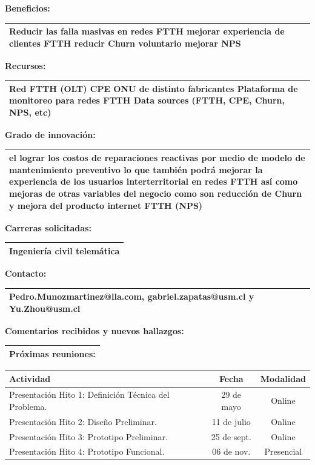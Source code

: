 \documentclass[12pt, a4paper]{article}
\newcommand{\cajarespuesta}[2]{
    \vspace{0.2cm}
    \noindent \textbf{#1} \\
    \begin{tabularx}{\textwidth}{|X|}
    \hline
    #2 %
    \vspace{0.1cm} \\ %
    \hline
    \end{tabularx}
}
\begin{document}
\cajarespuesta{Beneficios:}{Reducir las falla masivas en redes FTTH mejorar experiencia de clientes FTTH reducir Churn voluntario mejorar NPS}

\cajarespuesta{Recursos:}{Red FTTH (OLT) CPE ONU de distinto fabricantes Plataforma de monitoreo para redes FTTH Data sources (FTTH, CPE, Churn, NPS, etc)}

\cajarespuesta{Grado de innovación:}{el lograr los costos de reparaciones reactivas por medio de modelo de mantenimiento preventivo lo que también podrá mejorar la experiencia de los usuarios interterritorial en redes FTTH así como mejoras de otras variables del negocio como son reducción de Churn y mejora del producto internet FTTH (NPS)}

\cajarespuesta{Carreras solicitadas:}{Ingeniería civil telemática}
\newpage
\cajarespuesta{Contacto:}{Pedro.Munozmartinez@lla.com, gabriel.zapatas@usm.cl y Yu.Zhou@usm.cl}

\cajarespuesta{Comentarios recibidos y nuevos hallazgos:}{Próximas reuniones:}

        \small %
        \setlength{\tabcolsep}{4pt} %
        \renewcommand{\arraystretch}{1.4} %
        
        \begin{tabularx}{1\textwidth}{|X|c|c|} %
        \hline
        \textbf{Actividad} & \textbf{Fecha} & \textbf{Modalidad} \\ \hline
        Presentación Hito 1: Definición Técnica del Problema. & 29 de mayo & Online \\ \hline
        Presentación Hito 2: Diseño Preliminar. & 11 de julio & Online \\ \hline
        Presentación Hito 3: Prototipo Preliminar. & 25 de sept. & Online \\ \hline
        Presentación Hito 4: Prototipo Funcional. & 06 de nov. & Presencial \\ \hline
        \end{tabularx}
\end{document}
